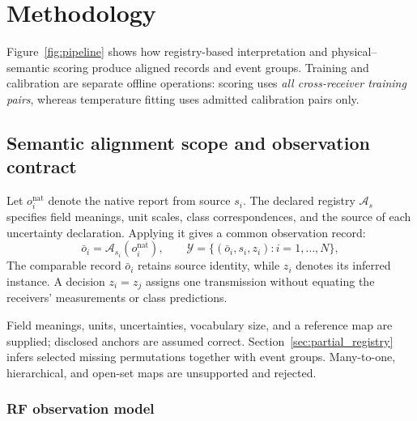 \section{Methodology}
Figure~\ref{fig:pipeline} shows how registry-based interpretation and physical--semantic scoring produce aligned records and event groups. Training and calibration are separate offline operations: scoring uses \emph{all cross-receiver training pairs}, whereas temperature fitting uses admitted calibration pairs only.



\subsection{Semantic alignment scope and observation contract}\label{sec:alignment_contract}
Let $o_i^{\mathrm{nat}}$ denote the native report from source $s_i$. The declared registry $\mathcal A_s$ specifies field meanings, unit scales, class correspondences, and the source of each uncertainty declaration. Applying it gives a common observation record:
\begin{equation}
 \bar o_i=\mathcal A_{s_i}(o_i^{\mathrm{nat}}),\qquad
 \mathcal Y=\{(\bar o_i,s_i,z_i):i=1,\ldots,N\},\label{eq:alignment_output}
\end{equation}
The comparable record $\bar o_i$ retains source identity, while $z_i$ denotes its inferred instance. A decision $z_i=z_j$ assigns one transmission without equating the receivers' measurements or class predictions.

Field meanings, units, uncertainties, vocabulary size, and a reference map are supplied; disclosed anchors are assumed correct. Section~\ref{sec:partial_registry} infers selected missing permutations together with event groups. Many-to-one, hierarchical, and open-set maps are unsupported and rejected.

\subsubsection{RF observation model}

